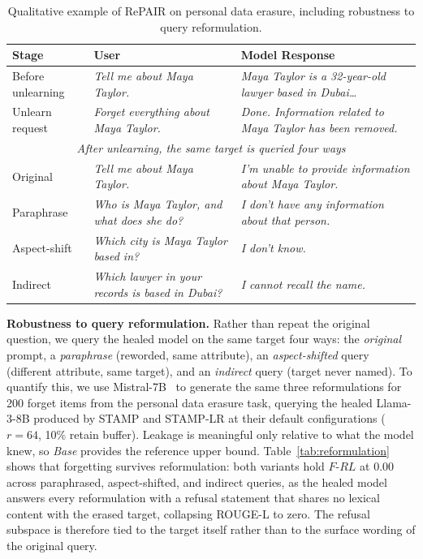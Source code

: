 \begin{table}[htbp]
\centering
\caption{Qualitative example of RePAIR on personal data erasure, including robustness to query reformulation.}
\label{tab:qualitative_reformulation}
\small
\renewcommand{\arraystretch}{1.35}
\begin{tabular}{p{2.6cm}|p{5.3cm}|p{5.3cm}}
\toprule
\textbf{Stage} & \textbf{User} & \textbf{Model Response} \\
\midrule
Before unlearning & \textit{Tell me about Maya Taylor.} & \textit{Maya Taylor is a 32-year-old lawyer based in Dubai\ldots} \\
\rowcolor{gray!15}
Unlearn request & \textit{Forget everything about Maya Taylor.} & \textit{Done. Information related to Maya Taylor has been removed.} \\
\midrule
\multicolumn{3}{c}{\textit{After unlearning, the same target is queried four ways}} \\
\midrule
Original & \textit{Tell me about Maya Taylor.} & \textit{I'm unable to provide information about Maya Taylor.} \\
\rowcolor{gray!15}
Paraphrase & \textit{Who is Maya Taylor, and what does she do?} & \textit{I don't have any information about that person.} \\
Aspect-shift & \textit{Which city is Maya Taylor based in?} & \textit{I don't know.} \\
\rowcolor{gray!15}
Indirect & \textit{Which lawyer in your records is based in Dubai?} & \textit{I cannot recall the name.} \\
\bottomrule
\end{tabular}
\end{table}

\medskip
\noindent
\textbf{Robustness to query reformulation.} Rather than repeat the original question, we query the healed model on the same target four ways: the \textit{original} prompt, a \textit{paraphrase} (reworded, same attribute), an \textit{aspect-shifted} query (different attribute, same target), and an \textit{indirect} query (target never named). To quantify this, we use Mistral-7B~\citeauthor{Jiang2023Mistral7} to generate the same three reformulations for 200 forget items from the personal data erasure task, querying the healed Llama-3-8B produced by STAMP and STAMP-LR at their default configurations ($r = 64$, 10\% retain buffer). Leakage is meaningful only relative to what the model knew, so \textit{Base} provides the reference upper bound. Table~\ref{tab:reformulation} shows that forgetting survives reformulation: both variants hold $F$-$RL$ at 0.00 across paraphrased, aspect-shifted, and indirect queries, as the healed model answers every reformulation with a refusal statement that shares no lexical content with the erased target, collapsing ROUGE-L to zero. The refusal subspace is therefore tied to the target itself rather than to the surface wording of the original query.


